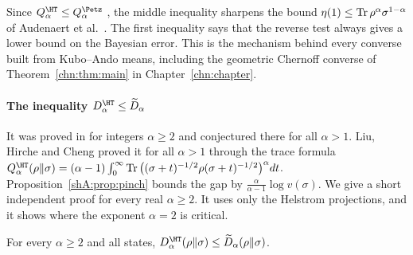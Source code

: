 Since $Q^\HT_\alpha\le Q^\Petz_\alpha$ \cite{BeigiHircheTomamichel2025}, the middle inequality sharpens the bound $\eta(1)\le\operatorname{Tr}\rho^\alpha\sigma^{1-\alpha}$ of Audenaert et al.\ \cite{AudenaertChernoff2007}. The first inequality says that the reverse test always gives a lower bound on the Bayesian error. This is the mechanism behind every converse built from Kubo--Ando means, including the geometric Chernoff converse of Theorem~\ref{chn:thm:main} in Chapter~\ref{chn:chapter}.

\paragraph{The inequality $D^\HT_\alpha\le\widetilde D_\alpha$} It was proved in \cite{BeigiHircheTomamichel2025} for integers $\alpha\ge2$ and conjectured there for all $\alpha>1$. Liu, Hirche and Cheng \cite{LiuHircheCheng2025} proved it for all $\alpha>1$ through the trace formula $Q^\HT_\alpha(\rho\|\sigma)=(\alpha-1)\int_0^\infty\Tr\big((\sigma+t)^{-1/2}\rho(\sigma+t)^{-1/2}\big)^\alpha dt$. Proposition~\ref{shA:prop:pinch} bounds the gap by $\frac{\alpha}{\alpha-1}\log v(\sigma)$. We give a short independent proof for every real $\alpha\ge2$. It uses only the Helstrom projections, and it shows where the exponent $\alpha=2$ is critical.

\begin{theorem}\label{shB:thm:bht2}
For every $\alpha\ge2$ and all states, $D^\HT_\alpha(\rho\|\sigma)\le\widetilde D_\alpha(\rho\|\sigma)$.
\end{theorem}


